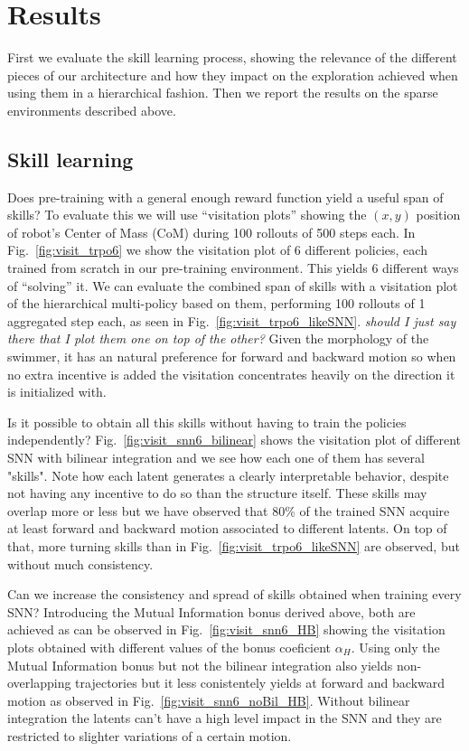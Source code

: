 \documentclass{article} %
\begin{document}
\section{Results}

First we evaluate the skill learning process, showing the relevance of the different pieces of our architecture and how they impact on the exploration achieved when using them in a hierarchical fashion. Then we report the results on the sparse environments described above.

\subsection{Skill learning}

Does pre-training with a general enough reward function yield a useful span of skills? To evaluate this we will use ``visitation plots'' showing the $(x,y)$ position of robot's Center of Mass (CoM) during 100 rollouts of 500 steps each. In Fig.\ \ref{fig:visit_trpo6} we show the visitation plot of 6 different policies, each trained from scratch in our pre-training environment. This yields 6 different ways of ``solving'' it. We can evaluate the combined span of skills with a visitation plot of the hierarchical multi-policy based on them, performing 100 rollouts of 1 aggregated step each, as seen in Fig.\ \ref{fig:visit_trpo6_likeSNN}. \textit{should I just say there that I plot them one on top of the other?} Given the morphology of the swimmer, it has an natural preference for forward and backward motion so when no extra incentive is added the visitation concentrates heavily on the direction it is initialized with.

Is it possible to obtain all this skills without having to train the policies independently? Fig.\ \ref{fig:visit_snn6_bilinear} shows the visitation plot of different SNN with bilinear integration and we see how each one of them has several "skills". Note how each latent generates a clearly interpretable behavior, despite not having any incentive to do so than the structure itself. These skills may overlap more or less but we have observed that 80\% of the trained SNN acquire at least forward and backward motion associated to different latents. On top of that, more turning skills than in Fig.\ \ref{fig:visit_trpo6_likeSNN} are observed, but without much consistency.

Can we increase the consistency and spread of skills obtained when training every SNN? Introducing the Mutual Information bonus derived above, both are achieved as can be observed in Fig.\ \ref{fig:visit_snn6_HB} showing the visitation plots obtained with different values of the bonus coeficient $\alpha_H$. Using only the Mutual Information bonus but not the bilinear integration also yields non-overlapping trajectories but it less conistentely yields at forward and backward motion as observed in Fig.\ \ref{fig:visit_snn6_noBil_HB}. Without bilinear integration the latents can't have a high level impact in the SNN and they are restricted to slighter variations of a certain motion.
\end{document}
